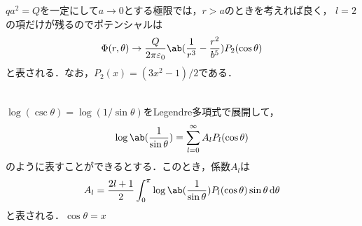  $qa^2 = Q$を一定にして$a \to 0$とする極限では，$r > a$のときを考えれば良く，
 $l = 2$の項だけが残るのでポテンシャルは
  \begin{gather}%
    \Phi(r ,\theta) \to \frac{Q}{2\pi\eps_0} \ab(\frac{1}{r^3} - \frac{r^2}{b^5}) P_2(\cos\theta)
  \end{gather}%
  と表される．なお，$P_2(x) = (3x^2 - 1)/2$である．


\hrulefill\\
  $\log(\csc\theta) = \log(1/\sin\theta)$をLegendre多項式で展開して，
  \begin{gather}%
    \log\ab(\frac{1}{\sin\theta}) = \sum_{l=0}^\infty A_l P_l(\cos\theta)
  \end{gather}%
   のように表すことができるとする．このとき，係数$A_l$は
   \begin{gather}%
     A_l = \frac{2l+1}{2} \int_0^\pi \log\ab(\frac{1}{\sin\theta}) P_l(\cos\theta) \sin\theta \dl{\theta}
   \end{gather}%
   と表される．$\cos\theta = x$










